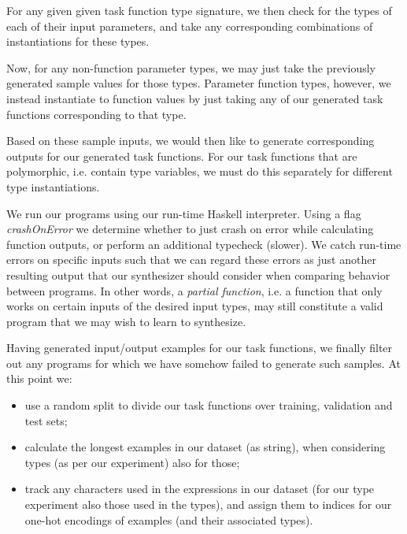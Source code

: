 \documentclass{article}
\begin{document}
For any given given task function type signature,
we then check for the types of each of their input parameters,
and take any corresponding combinations of instantiations for these types.

Now, for any non-function parameter types,
we may just take the previously generated sample values for those types.
Parameter function types, however,
we instead instantiate to function values by just taking
any of our generated task functions corresponding to that type.

Based on these sample inputs, we would then like to generate corresponding outputs for our generated task functions.
For our task functions that are polymorphic, i.e. contain type variables,
we must do this separately for different type instantiations.


We run our programs using our run-time Haskell interpreter.
Using a flag \emph{crashOnError} we determine whether to
just crash on error while calculating function outputs,
or perform an additional typecheck (slower).
We catch run-time errors on specific inputs such that
we can regard these errors as just another resulting output
that our synthesizer should consider when comparing behavior between programs.
In other words, a \emph{partial function},
i.e. a function that only works on certain inputs of the desired input types,
may still constitute a valid program that we may wish to learn to synthesize.


Having generated input/output examples for our task functions,
we finally filter out any programs for which we have somehow failed to generate such samples.
At this point we:
\begin{itemize}
    \item use a random split to divide our task functions over training, validation and test sets;
    \item calculate the longest examples in our dataset (as string), when considering types (as per our experiment) also for those;
    \item track any characters used in the expressions in our dataset
    (for our type experiment also those used in the types),
    and assign them to indices for our one-hot encodings of examples (and their associated types).    
\end{itemize}
\end{document}
